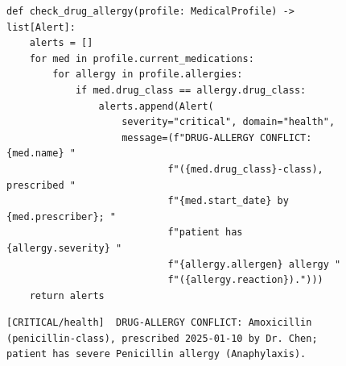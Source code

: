 \begin{figure}[htbp]
\begin{lstlisting}[caption={The constraint the coding agent writes once, against the typed state. The interpreter executes it deterministically -- no LLM at check time.},label={lst:teaser-constraint}]
def check_drug_allergy(profile: MedicalProfile) -> list[Alert]:
    alerts = []
    for med in profile.current_medications:
        for allergy in profile.allergies:
            if med.drug_class == allergy.drug_class:
                alerts.append(Alert(
                    severity="critical", domain="health",
                    message=(f"DRUG-ALLERGY CONFLICT: {med.name} "
                            f"({med.drug_class}-class), prescribed "
                            f"{med.start_date} by {med.prescriber}; "
                            f"patient has {allergy.severity} "
                            f"{allergy.allergen} allergy "
                            f"({allergy.reaction}).")))
    return alerts
\end{lstlisting}
\end{figure}

\begin{figure}[htbp]
\begin{lstlisting}[style=alertstyle,caption={Alert surfaced in \texttt{ACTIVE\_ALERTS} at the start of every subsequent session. No retrieval, no question asked -- the constraint fired the moment the state was updated.},label={lst:teaser-alert}]
[CRITICAL/health]  DRUG-ALLERGY CONFLICT: Amoxicillin
(penicillin-class), prescribed 2025-01-10 by Dr. Chen;
patient has severe Penicillin allergy (Anaphylaxis).
\end{lstlisting}
\end{figure}

